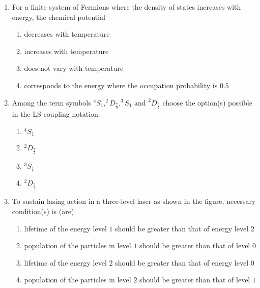 \documentclass[journal]{IEEEtran}
\begin{document}
\begin{enumerate}[start=14]
    \item For a finite system of Fermions where the density of states increases with energy, the chemical potential
    \begin{enumerate}
        \item decreases with temperature
        \item increases with temperature
        \item does not vary with temperature
        \item corresponds to the energy where the occupation probability is $0.5$
    \end{enumerate}

    \item Among the term symbols $^4 S_1 , ^2 D_{\frac{7}{2}} , ^3 S_1 \text{ and } ^2 D_{\frac{5}{2}}$ choose the option(s) possible in the LS coupling notation.
    \begin{enumerate}
        \item $^4 S_1$
        \item $^2 D_{\frac{7}{2}}$
        \item $^3 S_1$
        \item $^2 D_{\frac{5}{2}}$
    \end{enumerate}

    \item To sustain lasing action in a three-level laser as shown in the figure, necessary condition(s) is (are)
    \begin{figure}[!ht]
\centering
{}%

\label{fig:my_label}
\end{figure}
    \begin{enumerate}
        \item lifetime of the energy level $1$ should be greater than that of energy level $2$
        \item population of the particles in level $1$ should be greater than that of level $0$
        \item lifetime of the energy level $2$ should be greater than that of energy level $0$
        \item population of the particles in level $2$ should be greater than that of level $1$
    \end{enumerate}


\end{enumerate}
\end{document}
